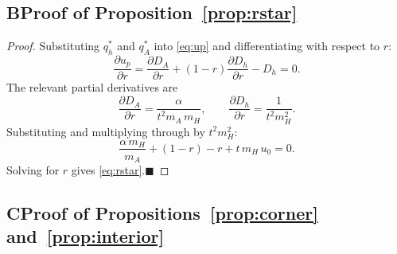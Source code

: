 \documentclass[mnsc,nonblindrev]{informs3_NoOR}
\begin{document}
\subsection*{B\quad Proof of Proposition~\ref{prop:rstar}}
\label{app:proof_rstar}
\begin{proof}
Substituting $q_h^*$ and $q_A^*$ into \eqref{eq:up} and differentiating with respect to $r$:
\begin{equation}
    \frac{\partial u_p}{\partial r} = \frac{\partial D_A}{\partial r} + (1-r)\frac{\partial D_h}{\partial r} - D_h = 0.
\end{equation}
The relevant partial derivatives are
\begin{equation}
    \frac{\partial D_A}{\partial r} = \frac{\alpha}{t^2 m_A\,m_H}, \qquad
    \frac{\partial D_h}{\partial r} = \frac{1}{t^2 m_H^2}.
\end{equation}
Substituting and multiplying through by $t^2 m_H^2$:
\[
    \frac{\alpha\,m_H}{m_A} + (1-r) - r + t\,m_H\,u_0 = 0.
\]
Solving for $r$ gives \eqref{eq:rstar}.\hfill$\blacksquare$
\end{proof}





\subsection*{C\quad Proof of Propositions~\ref{prop:corner} and~\ref{prop:interior}}
\label{app:proof_beta}
\end{document}

